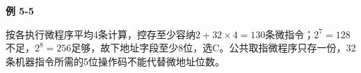 {\color{ink}\bfseries 例 5-5}\par\vspace{1bp}按各执行微程序平均4条计算，控存至少容纳\(2+\allowbreak{}32\times 4=\allowbreak{}130\)条微指令；\(2^{7}=\allowbreak{}128\)不足，\(2^{8}=\allowbreak{}256\)足够，故下地址字段至少8位，选C。公共取指微程序只存一份，32条机器指令所需的5位操作码不能代替微地址位数。

